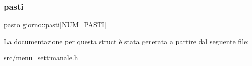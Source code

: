 \mbox{\label{structgiorno_a965ec0d1d5f6c22b57f8a94932350887}} 
\subsubsection{\texorpdfstring{pasti}{pasti}}
{\footnotesize\ttfamily \hyperlink{menu__settimanale_8h_a9bcb2afe3bf63e9bf406a2d1e7fa8644}{pasto} giorno\+::pasti\mbox{[}\hyperlink{menu__settimanale_8h_a2000ebf33ae486fb0f53926d79ae1c7f}{N\+U\+M\+\_\+\+P\+A\+S\+TI}\mbox{]}}



La documentazione per questa struct è stata generata a partire dal seguente file\+:\begin{DoxyCompactItemize}
\item 
src/\hyperlink{menu__settimanale_8h}{menu\+\_\+settimanale.\+h}\end{DoxyCompactItemize}
